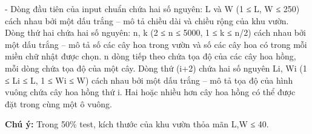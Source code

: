 - Dòng đầu tiên của input chuẩn chứa hai số nguyên: L và W (1 ≤ L, W ≤ 250) cách nhau bởi một dấu trắng – mô tả chiều dài và chiều rộng của khu vườn. Dòng thứ hai chứa hai số nguyên: n, k (2 ≤ n ≤ 5000, 1 ≤ k ≤ n/2) cách nhau bởi một dấu trắng – mô tả số các cây hoa trong vườn và số các cây hoa có trong mỗi miền chữ nhật được chọn. n dòng tiếp theo chứa tọa độ của các cây hoa hồng, mỗi dòng chứa tọa độ của một cây. Dòng thứ (i+2) chứa hai số nguyên Li, Wi (1 ≤ Li ≤ L, 1 ≤ Wi ≤ W) cách nhau bởi một dấu trắng – mô tả tọa độ của hình vuông chứa cây hoa hồng thứ i. Hai hoặc nhiều hơn cây hoa hồng có thể được đặt trong cùng một ô vuông.

\textbf{Chú ý: } Trong 50\% test, kích thước của khu vườn thỏa mãn L,W ≤ 40.